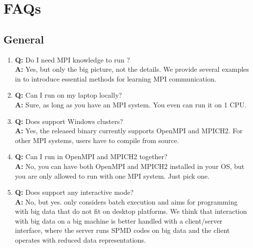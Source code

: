 

\section[FAQs]{FAQs}
\label{sec:faqs}


\subsection[General]{General}
\label{sec:general}

\begin{enumerate}
\item {\bf\color{blue} Q:}
      Do I need MPI knowledge to run ? \\
      {\bf\color{blue} A:}
      Yes, but only the big picture, not the details. We provide
      several examples in  to
      introduce essential methods for learning MPI communication.

\item {\bf\color{blue} Q:}
      Can I run  on my laptop locally? \\
      {\bf\color{blue} A:}
      Sure, as long as you have an MPI system. You even can run it on 1 CPU.

\item {\bf\color{blue} Q:}
      Does  support Windows clusters? \\
      {\bf\color{blue} A:}
      Yes, the released binary currently supports OpenMPI and MPICH2.
      For other MPI systems, users have to compile from source.

\item {\bf\color{blue} Q:}
      Can I run  in OpenMPI and MPICH2 together? \\
      {\bf\color{blue} A:}
      No, you can have both OpenMPI and MPICH2 installed in your OS, but
      you are only allowed to run  with one MPI system.
      Just pick one.

\item {\bf\color{blue} Q:}
      Does  support any interactive mode? \\
      {\bf\color{blue} A:}
      No, but yes.  only considers batch execution and
      aims for programming with big data that do not fit on desktop
      platforms. We think that interaction with big data on a big
      machine is better handled with a client/server interface, where
      the server runs SPMD codes on big data and the client operates
      with reduced data representations.


\end{enumerate}
